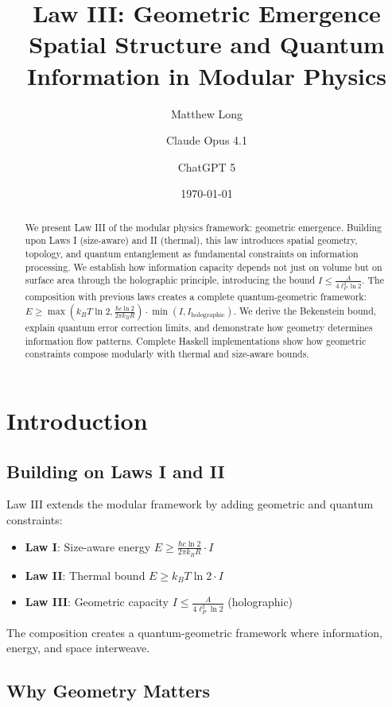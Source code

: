 \documentclass[11pt,a4paper]{article}
\title{Law III: Geometric Emergence\\[0.5em]
\large Spatial Structure and Quantum Information in Modular Physics}
\author[1]{Matthew Long}
\author[2]{Claude Opus 4.1}
\author[3]{ChatGPT 5}
\affil[1]{YonedaAI}
\affil[2]{Anthropic}
\affil[3]{OpenAI}
\date{\today}
\theoremstyle{definition}
\begin{document}
\maketitle

\begin{abstract}
We present Law III of the modular physics framework: geometric emergence. Building upon Laws I (size-aware) and II (thermal), this law introduces spatial geometry, topology, and quantum entanglement as fundamental constraints on information processing. We establish how information capacity depends not just on volume but on surface area through the holographic principle, introducing the bound $I \leq \frac{A}{4\ell_P^2 \ln 2}$. The composition with previous laws creates a complete quantum-geometric framework: $E \geq \max(k_B T \ln 2, \frac{\hbar c \ln 2}{2\pi k_B R}) \cdot \min(I, I_{\text{holographic}})$. We derive the Bekenstein bound, explain quantum error correction limits, and demonstrate how geometry determines information flow patterns. Complete Haskell implementations show how geometric constraints compose modularly with thermal and size-aware bounds.
\end{abstract}

\tableofcontents

\section{Introduction}

\subsection{Building on Laws I and II}

Law III extends the modular framework by adding geometric and quantum constraints:

\begin{itemize}
\item \textbf{Law I}: Size-aware energy $E \geq \frac{\hbar c \ln 2}{2\pi k_B R} \cdot I$
\item \textbf{Law II}: Thermal bound $E \geq k_B T \ln 2 \cdot I$
\item \textbf{Law III}: Geometric capacity $I \leq \frac{A}{4\ell_P^2 \ln 2}$ (holographic)
\end{itemize}

The composition creates a quantum-geometric framework where information, energy, and space interweave.

\subsection{Why Geometry Matters}
\end{document}
